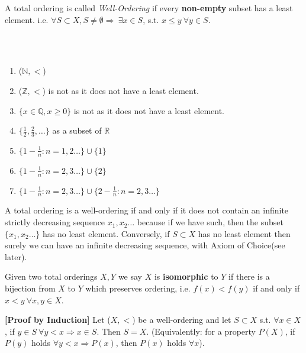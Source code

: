 A total ordering is called \emph{Well-Ordering} if every {\bf non-empty}
subset has a least element. i.e. $\forall S \subset X, S \neq \emptyset
\Rightarrow ~ \exists x \in S$, s.t. $x \le y ~\forall y \in S$.\\
~\\
\begin{example}
~\\
\begin{enumerate}
\item ($\mathbb{N},<$)\\
\item ($\mathbb{Z},<$) is not as it does not have a least element.\\
\item $\{x \in \mathbb{Q}, x \ge 0\}$ is not as it does not have a least element.\\
\item $\{\frac{1}{2}, \frac{2}{3},\ldots \}$ as a subset of $\mathbb{R}$\\
\item $\{1-\frac{1}{n}:n=1,2 \ldots \} \cup \{1\}$\\
\item $\{1-\frac{1}{n}:n=2,3 \ldots \} \cup \{2\}$\\
\item $\{1-\frac{1}{n}:n=2,3 \ldots \} \cup \{2-\frac{1}{n}:n=2,3 \ldots\}$\\
\end{enumerate}
\end{example}
\begin{remark}
A total ordering is a well-ordering if and only if it does not
contain an infinite strictly decreasing sequence $x_1,x_2 \ldots$
because if we have such, then the subset $\{x_1,x_2 \ldots \}$
has no least element.
Conversely, if $S \subset X$ has no least element then surely we
can have an infinite decreasing sequence, with Axiom of Choice(see later).
\end{remark}
\begin{definition}
Given two total orderings $X,Y$ we say $X$ is {\bf isomorphic} to $Y$
if there is a bijection from $X$ to $Y$ which preserves ordering,
i.e. $f(x)<f(y)$ if and only if $x<y ~\forall x,y \in X$.
\end{definition}
\begin{proposition}{\bf [Proof by Induction]}\label{I;Induction}
 Let ($X,<$) be a well-ordering and let $S \subset X$ s.t. $\forall
 x \in X$, if $y \in S ~\forall y<x \Rightarrow x \in S$. Then $S=X$.
(Equivalently: for a property $P(X)$, if $P(y)$ holds $\forall y<x
\Rightarrow P(x)$, then $P(x)$ holds $\forall x$).
\end{proposition}
